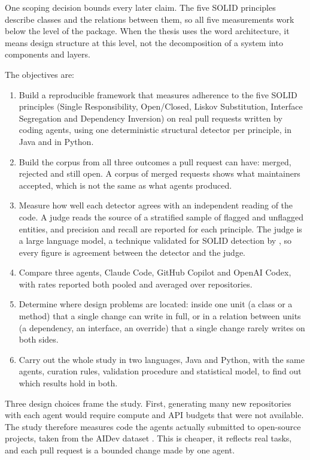 One scoping decision bounds every later claim. The five SOLID principles describe classes and the
relations between them, so all five measurements work below the level of the package. When the
thesis uses the word architecture, it means design structure at this level, not the decomposition of
a system into components and layers.

The objectives are:

\begin{enumerate}[label=\textbf{O\arabic*.}, leftmargin=1.6cm]
  \item Build a reproducible framework that measures adherence to the five SOLID principles (Single
  Responsibility, Open/Closed, Liskov Substitution, Interface Segregation and Dependency Inversion)
  on real pull requests written by coding agents, using one deterministic structural detector per
  principle, in Java and in Python.
  \item Build the corpus from all three outcomes a pull request can have: merged, rejected and still
  open. A corpus of merged requests shows what maintainers accepted, which is not the same as what
  agents produced.
  \item Measure how well each detector agrees with an independent reading of the code. A judge reads
  the source of a stratified sample of flagged and unflagged entities, and precision and recall are
  reported for each principle. The judge is a large language model, a technique validated for SOLID
  detection by \citet{pehlivan2025solid}, so every figure is agreement between the detector and the
  judge.
  \item Compare three agents, Claude Code, GitHub Copilot and OpenAI Codex, with rates reported both
  pooled and averaged over repositories.
  \item Determine where design problems are located: inside one unit (a class or a method) that a
  single change can write in full, or in a relation between units (a dependency, an interface, an
  override) that a single change rarely writes on both sides.
  \item Carry out the whole study in two languages, Java and Python, with the same agents, curation
  rules, validation procedure and statistical model, to find out which results hold in both.
\end{enumerate}

Three design choices frame the study. First, generating many new repositories with each agent would
require compute and API budgets that were not available. The study therefore measures code the
agents actually submitted to open-source projects, taken from the AIDev dataset
\citep{li2025aidev}. This is cheaper, it reflects real tasks, and each pull request is a bounded
change made by one agent.

